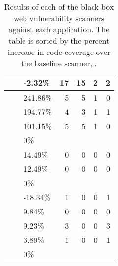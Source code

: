 \begin{table*}[tb]
\begin{tabular}{lll|rrrr}
 \skipfish{}  &  \vanillaforums{}  &  -2.32\%           & 17 & 15 & 2 & 2 \\
\hline
 \crawler{}   &  \wackopicko{}     &  241.86\%          & 5 & 5 & 1 & 0 \\
 \skipfish{}  &  \wackopicko{}     &  194.77\%          & 4 & 3 & 1 & 1 \\
 \waf{}      &  \wackopicko{}     &  101.15\%          & 5 & 5 & 1 & 0 \\
 \wget{}      &  \wackopicko{}     &  0\%                & & & & \\
\hline
 \crawler{}   &  \wordpresstwo{}     &  14.49\%           & 0 & 0 & 0 & 0 \\
 \waf{}      &  \wordpresstwo{}     &  12.49\%           & 0 & 0 & 0 & 0 \\
 \wget{}      &  \wordpresstwo{}     &  0\%                & & & & \\
 \skipfish{}  &  \wordpresstwo{}     &  -18.34\%          & 1 & 0 & 0 & 1 \\
\hline
 \crawler{}   &  \wordpress{}      &  9.84\%             & 0 & 0 & 0 & 0 \\
 \waf{}      &  \wordpress{}      &  9.23\%             & 3 & 0 & 0 & 3 \\
 \skipfish{}  &  \wordpress{}      &  3.89\%             & 1 & 0 & 0 & 1 \\
 \wget{}      &  \wordpress{}      &  0\%                & & & & \\
\hline
  \end{tabular}
  \caption{Results of each of the black-box web vulnerability scanners
    against each application. The table is sorted by the percent
    increase in code coverage over the baseline scanner, \wget{}.}
\end{table*}
